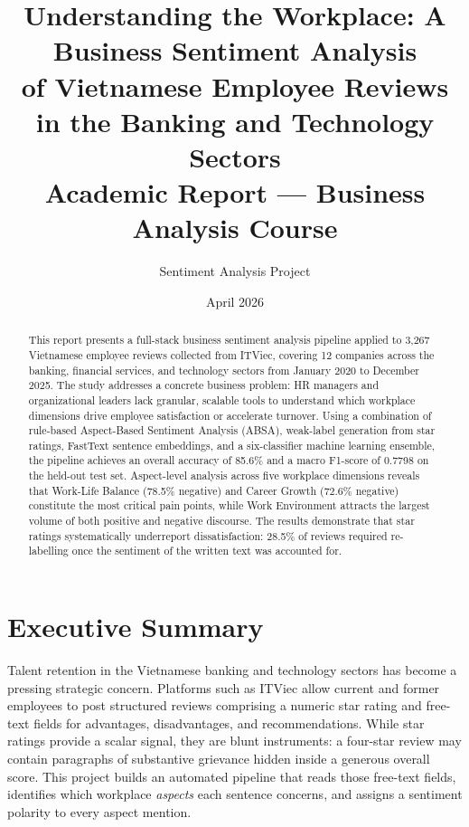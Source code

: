 \documentclass[12pt, a4paper]{article}
\title{
  \vspace{-1cm}
  \Large\textbf{Understanding the Workplace: A Business Sentiment Analysis\\
  of Vietnamese Employee Reviews in the Banking and Technology Sectors}\\[0.6em]
  \large Academic Report --- Business Analysis Course
}
\author{Sentiment Analysis Project}
\date{April 2026}
\begin{document}
\maketitle
\thispagestyle{fancy}

\begin{abstract}
\noindent
This report presents a full-stack business sentiment analysis pipeline applied to 3,267 Vietnamese employee reviews collected from ITViec, covering 12 companies across the banking, financial services, and technology sectors from January 2020 to December 2025. The study addresses a concrete business problem: HR managers and organizational leaders lack granular, scalable tools to understand which workplace dimensions drive employee satisfaction or accelerate turnover. Using a combination of rule-based Aspect-Based Sentiment Analysis (ABSA), weak-label generation from star ratings, FastText sentence embeddings, and a six-classifier machine learning ensemble, the pipeline achieves an overall accuracy of 85.6\% and a macro F1-score of 0.7798 on the held-out test set. Aspect-level analysis across five workplace dimensions reveals that Work-Life Balance (78.5\% negative) and Career Growth (72.6\% negative) constitute the most critical pain points, while Work Environment attracts the largest volume of both positive and negative discourse. The results demonstrate that star ratings systematically underreport dissatisfaction: 28.5\% of reviews required re-labelling once the sentiment of the written text was accounted for.
\end{abstract}

\newpage
\tableofcontents
\newpage

\section{Executive Summary}

Talent retention in the Vietnamese banking and technology sectors has become a pressing strategic concern. Platforms such as ITViec allow current and former employees to post structured reviews comprising a numeric star rating and free-text fields for advantages, disadvantages, and recommendations. While star ratings provide a scalar signal, they are blunt instruments: a four-star review may contain paragraphs of substantive grievance hidden inside a generous overall score. This project builds an automated pipeline that reads those free-text fields, identifies which workplace \textit{aspects} each sentence concerns, and assigns a sentiment polarity to every aspect mention.
\end{document}
